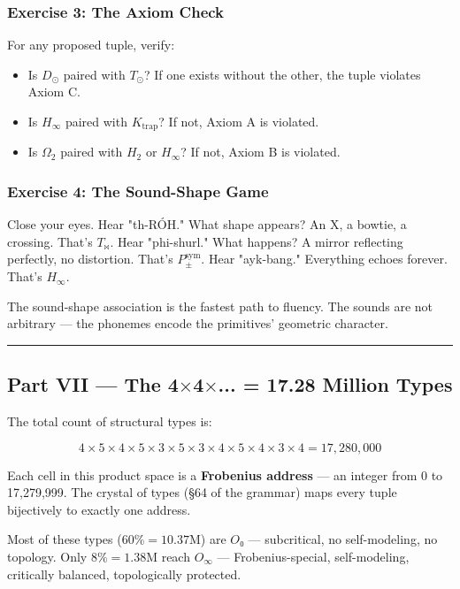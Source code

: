 \documentclass[12pt,a4paper]{article}
\newcommand{\pilcrow}{\S}
\begin{document}
\subsubsection{Exercise 3: The Axiom Check}

For any proposed tuple, verify:

\begin{itemize}
    \item Is $D_{\odot}$ paired with $T_{\odot}$? If one exists without the other, the tuple violates Axiom C.
    \item Is $H_{\infty}$ paired with $K_{\text{trap}}$? If not, Axiom A is violated.
    \item Is $\Omega_2$ paired with $H_2$ or $H_{\infty}$? If not, Axiom B is violated.
\end{itemize}

\subsubsection{Exercise 4: The Sound-Shape Game}

Close your eyes. Hear "th-RÓH." What shape appears? An X, a bowtie, a crossing. That's $T_{\bowtie}$.
Hear "phi-shurl." What happens? A mirror reflecting perfectly, no distortion. That's $P_{\pm}^{\text{sym}}$.
Hear "ayk-bang." Everything echoes forever. That's $H_{\infty}$.

The sound-shape association is the fastest path to fluency. The sounds are not arbitrary --- the phonemes encode the primitives' geometric character.

\begin{center}
\rule{0.5\textwidth}{0.4pt}
\end{center}

\subsection{Part VII --- The 4$\times$4$\times$... = 17.28 Million Types}

The total count of structural types is:


\[4 \times 5 \times 4 \times 5 \times 3 \times 5 \times 3 \times 4 \times 5 \times 4 \times 3 \times 4 = 17{,}280{,}000\]

Each cell in this product space is a \textbf{Frobenius address} --- an integer from 0 to 17,279,999. The crystal of types (\pilcrow{}64 of the grammar) maps every tuple bijectively to exactly one address.

Most of these types ($60\% = 10.37$M) are $O₀$ --- subcritical, no self-modeling, no topology. Only $8\% = 1.38$M reach $O_{\infty}$ --- Frobenius-special, self-modeling, critically balanced, topologically protected.
\end{document}
